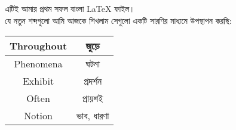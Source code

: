 \documentclass[16 pt]{article}
\begin{document}
এটিই আমার প্রথম সফল বাংলা \LaTeX{} ফাইল। \\
যে নতুন শব্দগুলো আমি আজকে শিখলাম সেগুলো একটি সারণির মাধ্যমে উপস্থাপন করছি: \\
\begin{tabular}{| c | c |}
	\hline 
	Throughout & জুড়ে \\ 
	\hline 
	Phenomena & ঘটনা \\ 
	\hline 
	Exhibit & প্রদর্শন \\
	\hline 
	Often & প্রায়শই \\ 
	\hline 
	Notion & ভাব, ধারণা \\ 
	\hline 
\end{tabular}
	
\end{document}
